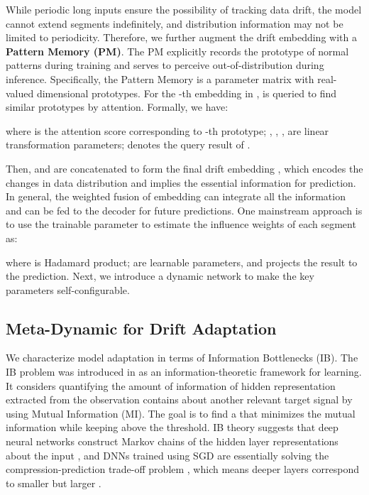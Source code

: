\documentclass[sigconf]{acmart}
\begin{document}
While periodic long inputs ensure the possibility of tracking data drift, the model cannot extend segments indefinitely, and distribution information may not be limited to periodicity. Therefore, we further augment the drift embedding  with a \textbf{Pattern Memory (PM)}. The PM explicitly records the prototype of normal patterns during training and serves to perceive out-of-distribution during inference. Specifically, the Pattern Memory  is a parameter matrix with  real-valued  dimensional prototypes. For the -th embedding in ,  is queried to find similar prototypes by attention. Formally, we have:

where  is the attention score corresponding to -th prototype; , , ,  are linear transformation parameters;  denotes the query result of .

Then,  and  are concatenated to form the final drift embedding , which encodes the changes in data distribution and implies the essential information for prediction. In general, the weighted fusion of embedding can integrate all the information and can be fed to the decoder for future predictions. One mainstream approach \cite{zhang2017deep,yao2019revisiting,bai2020adaptive} is to use the trainable parameter to estimate the influence weights of each segment as: 

where  is Hadamard product;  are learnable parameters, and  projects the result to the prediction. Next, we introduce a dynamic network to make the key parameters  self-configurable.

\subsection{Meta-Dynamic for Drift Adaptation}
We characterize model adaptation in terms of Information Bottlenecks (IB). The IB problem was introduced in \cite{tishby2000information} as an information-theoretic framework for learning. It considers quantifying the amount of information of hidden representation  extracted from the observation  contains about another relevant target signal  by using Mutual Information (MI). The goal is to find a  that minimizes the mutual information  while keeping  above the threshold. IB theory suggests that deep neural networks construct Markov chains of the hidden layer representations about the input , and DNNs trained using SGD are essentially solving the compression-prediction trade-off problem \cite{goldfeld2020information}, which means deeper layers correspond to smaller  but larger .
\end{document}
